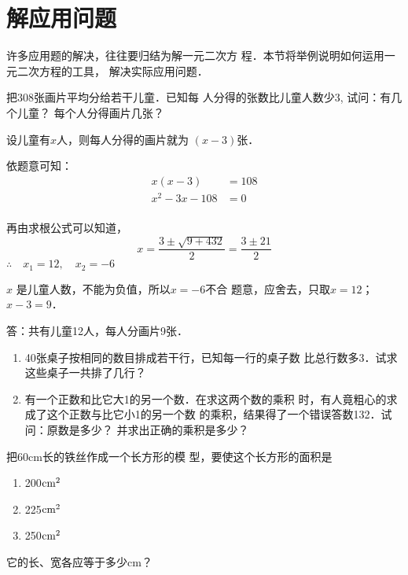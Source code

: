 \begin{enumerate}
\end{enumerate}


\section{解应用问题}
许多应用题的解决，往往要归结为解一元二次方
程．本节将举例说明如何运用一元二次方程的工具，
解决实际应用问题．

\begin{example}
把308张画片平均分给若干儿童．已知每
人分得的张数比儿童人数少3, 试问：有几个儿童？
每个人分得画片几张？
\end{example}

\begin{solution}
    设儿童有$x$人，则每人分得的画片就为
$(x-3)$张．

依题意可知：\[\begin{split}
    x(x-3)&=108\\
x^2-3x-108&=0\\
\end{split}\]

再由求根公式可以知道，
\[x=\frac{3\pm\sqrt{9+432}}{2}=\frac{3\pm 21}{2}  \]
$\therefore\quad x_1=12,\quad x_2=-6$

$x$
是儿童人数，不能为负值，所以$x=-6$不合
题意，应舍去，只取$x=12$； $x-3=9$．

答：共有儿童12人，每人分画片9张．
\end{solution}

\begin{ex}
\begin{enumerate}
    \item 40张桌子按相同的数目排成若干行，已知每一行的桌子数
    比总行数多3．试求这些桌子一共排了几行？
    \item 有一个正数和比它大1的另一个数．在求这两个数的乘积
    时，有人竟粗心的求成了这个正数与比它小1的另一个数
    的乘积，结果得了一个错误答数132．试问：原数是多少？
    并求出正确的乘积是多少？
\end{enumerate}
\end{ex}

\begin{example}
    把60cm长的铁丝作成一个长方形的模
    型，要使这个长方形的面积是
    \begin{multicols}{3}
        \begin{enumerate}
        \item 200${\rm cm}^2$
        \item 225${\rm cm}^2$
        \item 250${\rm cm}^2$
    \end{enumerate}        
    \end{multicols}
        
它的长、宽各应等于多少cm？
\end{example}


